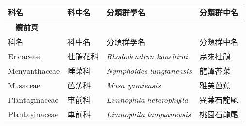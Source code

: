     \begin{longtable}{p{3cm}p{2cm}p{5cm}p{3cm}}
    \toprule
      科名 & 科中名 & 分類群學名 & 分類群中名  \\
    \midrule 
    \endfirsthead
    
    {{\bfseries \tablename\ \thetable{} 續前頁 }} \\
    科名 & 科中名 & 分類群學名 & 分類群中名  \\
    \midrule
    \endhead
    Ericaceae & 杜鵑花科 & \textit{Rhododendron kanehirai}  & 烏來杜鵑 \index{Rhododendron@\textit{Rhododendron}!kanehirai@\textit{kanehirai}}  \index{烏來杜鵑} \\
    Menyanthaceae & 睡菜科 & \textit{Nymphoides lungtanensis}  & 龍潭莕菜 \index{Nymphoides@\textit{Nymphoides}!lungtanensis@\textit{lungtanensis}} \index{龍潭莕菜} \\
    Musaceae & 芭蕉科 & \textit{Musa yamiensis}  & 雅美芭蕉 \index{Musa@\textit{Musa}!yamiensis@\textit{yamiensis}} \index{雅美芭蕉} \\
    Plantaginaceae & 車前科 & \textit{Limnophila heterophylla}  & 異葉石龍尾 \index{Limnophila@\textit{Limnophila}!heterophylla@\textit{heterophylla}} \index{異葉石龍尾} \\
    Plantaginaceae & 車前科 & \textit{Limnophila taoyuanensis}  & 桃園石龍尾 \index{Limnophila@\textit{Limnophila}!taoyuanensis@\textit{taoyuanensis}} \index{桃園石龍尾} \\
    \bottomrule
    \end{longtable}
